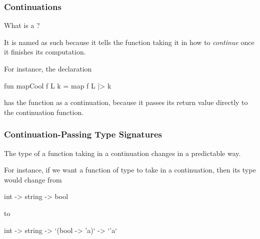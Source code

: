 \documentclass[aspectratio=169, handout]{beamer}
\begin{document}

\begin{frame}[fragile]
  \frametitle{Continuations}

  What is a ?

  \pause
  \vspace{\fill}


  \pause
  \vspace{\fill}

  It is named as such because it tells the function taking it in how to
  \textit{continue} once it finishes its computation.

  \pause
  \vspace{\fill}

  For instance, the declaration
  \begin{codeblock}
    fun mapCool f L k = map f L |> k
  \end{codeblock}
  has the function  as a continuation, because it passes its
  return value directly to the continuation function.
\end{frame}

\begin{frame}[fragile]
  \frametitle{Continuation-Passing Type Signatures}

  The type of a function taking in a continuation changes in a predictable way.

  \pause
  \vspace{\fill}

  For instance, if we want a function of type  to
  take in a continuation, then its type would change from
  \begin{codeblock}
    int -> string -> bool
  \end{codeblock}
  to
  \begin{codeblock}
    int -> string -> `(bool -> 'a)` -> `'a`
  \end{codeblock}

  \pause
  \vspace{\fill}

\end{frame}
\end{document}
